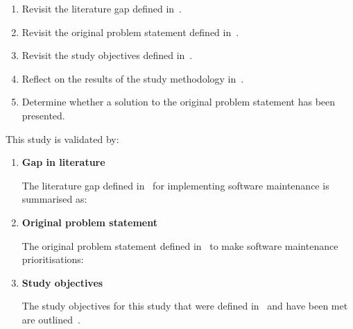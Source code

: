 \begin{enumerate}[label=\textbf{\Roman*.}]
	\item Revisit the literature gap defined in~.
	\item Revisit the original problem statement defined in~.
	\item Revisit the study objectives defined in~.
	\item Reflect on the results of the study methodology in~.
	\item Determine whether a solution to the original problem statement has been presented. 
\end{enumerate}

This study is validated by:

\begin{enumerate}[label=\textbf{\Roman*.}]
	\item \textbf{Gap in literature} \par The literature gap defined in~ for implementing software maintenance is summarised as: 
		\begin{center}
			\begin{tcolorbox}[colback=lightgray, colframe=black, sharp corners=all, arc=4pt]
				\begin{minipage}{\textwidth}
					\RaggedRight\textit{\studyGap}
				\end{minipage}
			\end{tcolorbox}
		\end{center}

	\item \textbf{Original problem statement} \par The original problem statement defined in~ to make software maintenance prioritisations:
		\begin{center}
			\begin{tcolorbox}[colback=lightgray, colframe=black, sharp corners=all, arc=4pt]
				\begin{minipage}{\textwidth}
					\RaggedRight\textit{\problemStatement}
				\end{minipage}
			\end{tcolorbox}
		\end{center}

	\item \textbf{Study objectives} \par The study objectives for this study that were defined in~ and have been met are outlined~. 


\end{enumerate}
